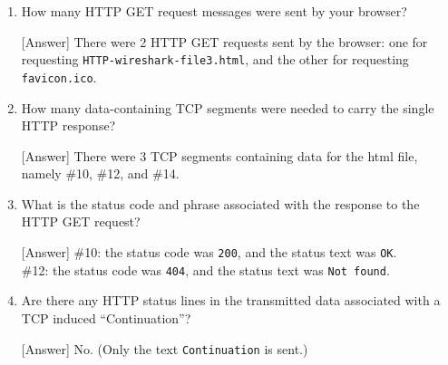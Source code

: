 \documentclass{homework}
\begin{document}
\begin{enumerate}[label={(\arabic*)}]
  \item How many HTTP GET request messages were sent by your browser?
  
  \textsf{[Answer]} There were 2 HTTP GET requests sent by the browser: one for requesting \texttt{HTTP-wireshark-file3.html}, and the other for requesting \texttt{favicon.ico}.

  \item How many data-containing TCP segments were needed to carry the single HTTP response?
  
  \textsf{[Answer]} There were 3 TCP segments containing data for the html file, namely \#10, \#12, and \#14.

  \item What is the status code and phrase associated with the response to the HTTP GET request?
  
  \textsf{[Answer]} \#10: the status code was \texttt{200}, and the status text was \texttt{OK}. \\
  \#12: the status code was \texttt{404}, and the status text was \texttt{Not found}.

  \item Are there any HTTP status lines in the transmitted data associated with a TCP induced “Continuation”?
  
  \textsf{[Answer]} No. (Only the text \texttt{Continuation} is sent.)

  \newpage


\end{enumerate}
\end{document}
